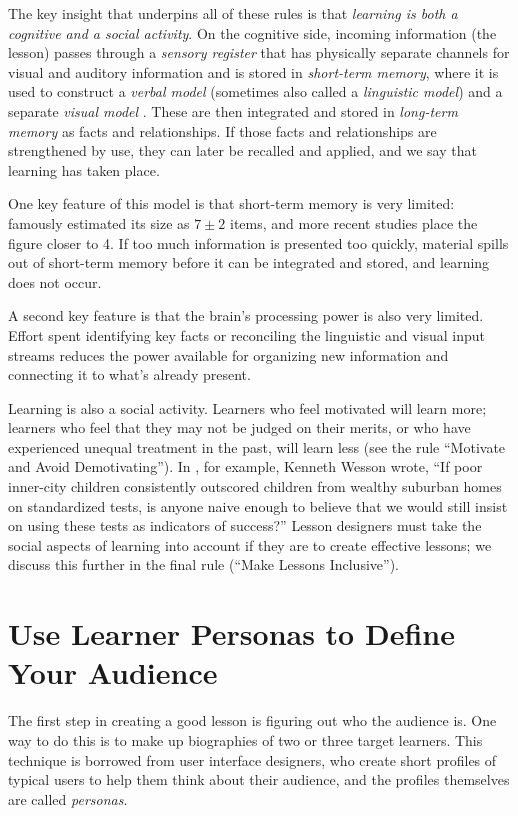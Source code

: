 \documentclass[10pt,letterpaper]{article}
\newcommand{\rulemajor}[1]{\section{#1}}
\begin{document}
The key insight that underpins all of these rules is that \emph{learning is both
  a cognitive and a social activity}.  On the cognitive side, incoming
information (the lesson) passes through a \emph{sensory register} that has
physically separate channels for visual and auditory information and is stored
in \emph{short-term memory}, where it is used to construct a \emph{verbal model}
(sometimes also called a \emph{linguistic model}) and a separate \emph{visual
  model} \cite{Maye2009}.  These are then integrated and stored in
\emph{long-term memory} as facts and relationships.  If those facts and
relationships are strengthened by use, they can later be recalled and applied,
and we say that learning has taken place.

One key feature of this model is that short-term memory is very limited:
\cite{Mill1956} famously estimated its size as $7{\pm}2$ items, and more
recent studies place the figure closer to 4.  If too much information is
presented too quickly, material spills out of short-term memory before it can be
integrated and stored, and learning does not occur.

A second key feature is that the brain's processing power is also very limited.
Effort spent identifying key facts or reconciling the linguistic and visual
input streams reduces the power available for organizing new information and
connecting it to what's already present.

Learning is also a social activity. Learners who feel motivated will learn more;
learners who feel that they may not be judged on their merits, or who have
experienced unequal treatment in the past, will learn less (see the rule
``Motivate and Avoid Demotivating''). In \cite{Litt2004}, for example, Kenneth
Wesson wrote, ``If poor inner-city children consistently outscored children from
wealthy suburban homes on standardized tests, is anyone naive enough to believe
that we would still insist on using these tests as indicators of success?''
Lesson designers must take the social aspects of learning into account if they
are to create effective lessons; we discuss this further in the final rule
(``Make Lessons Inclusive'').

\rulemajor{Use Learner Personas to Define Your Audience}

The first step in creating a good lesson is figuring out who the audience is.
One way to do this is to make up biographies of two or three target learners.
This technique is borrowed from user interface designers, who create short
profiles of typical users to help them think about their audience, and the
profiles themselves are called \emph{personas}.
\end{document}
